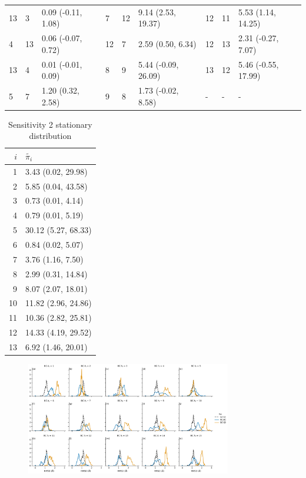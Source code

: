 \begin{table}[]
\begin{tabular}{lllllllll}
     13 &   3 &     0.09 (-0.11, 1.08) &   7 &  12 &    9.14 (2.53, 19.37) &  12 &  11 &   5.53 (1.14, 14.25) \\
      4 &  13 &     0.06 (-0.07, 0.72) &  12 &   7 &     2.59 (0.50, 6.34) &  12 &  13 &   2.31 (-0.27, 7.07) \\
     13 &   4 &     0.01 (-0.01, 0.09) &   8 &   9 &   5.44 (-0.09, 26.09) &  13 &  12 &  5.46 (-0.55, 17.99) \\
      5 &   7 &      1.20 (0.32, 2.58) &   9 &   8 &    1.73 (-0.02, 8.58) &   - &   - &                    - \\
    \hline
    \end{tabular}
\end{table}

\begin{table}
    \centering
    \caption{Sensitivity 2 stationary distribution}
    \label{tab:my_label}
   \begin{tabular}{rl}
    \toprule
     $i$ &    $\tilde{\pi_{i}}$ \\
    \midrule
       1 &   3.43 (0.02, 29.98) \\
       2 &   5.85 (0.04, 43.58) \\
       3 &    0.73 (0.01, 4.14) \\
       4 &    0.79 (0.01, 5.19) \\
       5 &  30.12 (5.27, 68.33) \\
       6 &    0.84 (0.02, 5.07) \\
       7 &    3.76 (1.16, 7.50) \\
       8 &   2.99 (0.31, 14.84) \\
       9 &   8.07 (2.07, 18.01) \\
      10 &  11.82 (2.96, 24.86) \\
      11 &  10.36 (2.82, 25.81) \\
      12 &  14.33 (4.19, 29.52) \\
      13 &   6.92 (1.46, 20.01) \\
    \bottomrule
    \end{tabular}
\end{table}

\begin{figure}
    \centering
    \label{fig:sens_2_overlap}
    \includegraphics[width=0.8\textwidth]{chapters/aadh/figures/sensitivity_2_5_overlap.png}

\end{figure}




